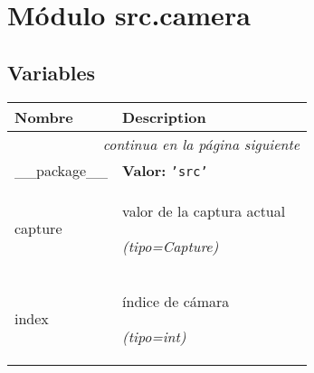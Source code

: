 %
%
%


\section{Módulo src.camera}

    \label{src:camera}


  \subsection{Variables}

    \vspace{-1cm}
\hspace{\varindent}\begin{longtable}{|p{\varnamewidth}|p{\vardescrwidth}|l}
\cline{1-2}
\cline{1-2} \centering \textbf{Nombre} & \centering \textbf{Description}& \\
\cline{1-2}
\endhead\cline{1-2}\multicolumn{3}{r}{\small\textit{continua en la página siguiente}}\\\endfoot\cline{1-2}
\endlastfoot\raggedright \_\-\_\-p\-a\-c\-k\-a\-g\-e\-\_\-\_\- & \raggedright \textbf{Valor:} 
{\tt \texttt{'}\texttt{src}\texttt{'}}&\\
\cline{1-2}
\raggedright c\-a\-p\-t\-u\-r\-e\- & \raggedright valor de la captura actual

            {\it (tipo=Capture)}&\\
\cline{1-2}
\raggedright i\-n\-d\-e\-x\- & \raggedright índice de cámara

            {\it (tipo=int)}&\\
\cline{1-2}
\end{longtable}



